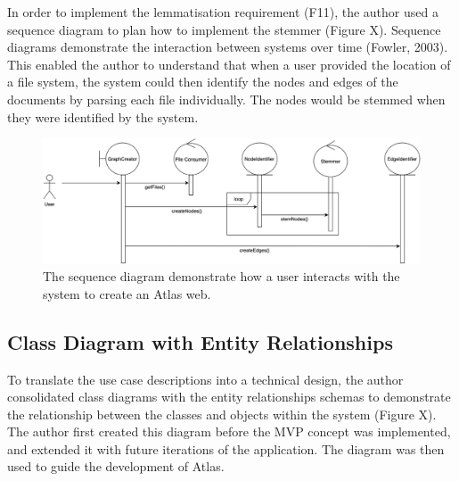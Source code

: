 \documentclass{article}
\begin{document}
\begin{table}[]
\centering
\caption{The functional requirements and use cases that defined the fourth iteration of Atlas.}
\label{tab:my-table}
\end{table}

In order to implement the lemmatisation requirement (F11), the author used a sequence diagram to plan how to implement the stemmer (Figure X). Sequence diagrams demonstrate the interaction between systems over time (Fowler, 2003). This enabled the author to understand that when a user provided the location of a file system, the system could then identify the nodes and edges of the documents by parsing each file individually. The nodes would be stemmed when they were identified by the system.

\begin{figure}[!htb]
  \centering
      \includegraphics[width=1\textwidth]{images/sequence-diagram.png}
  \caption{The sequence diagram demonstrate how a user interacts with the system to create an Atlas web.}
\end{figure}

\subsection{Class Diagram with Entity Relationships}

To translate the use case descriptions into a technical design, the author consolidated class diagrams with the entity relationships schemas to demonstrate the relationship between the classes and objects within the system (Figure X). The author first created this diagram before the MVP concept was implemented, and extended it with future iterations of the application. The diagram was then used to guide the development of Atlas.
\end{document}
